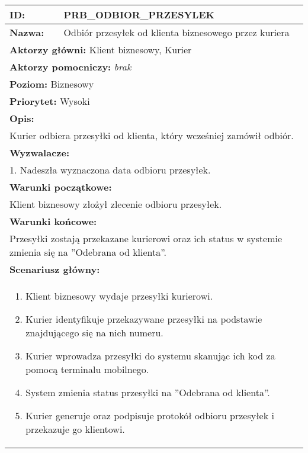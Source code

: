 \begin{center}
\begin{longtable}[h]{|p{1.6cm}|p{13.5cm}|}
\hline
\textbf{ID:} & PRB\_ODBIOR\_PRZESYLEK \\ \hline
\textbf{Nazwa:} & Odbiór przesyłek od klienta biznesowego przez kuriera \\ \hline
\multicolumn{2}{|p{15.1cm}|}{\textbf{Aktorzy główni:}  Klient biznesowy, Kurier} \\
\multicolumn{2}{|p{15.1cm}|}{\textbf{Aktorzy pomocniczy:} \textit{brak}} \\
\multicolumn{2}{|p{15.1cm}|}{\textbf{Poziom:}  Biznesowy} \\
\multicolumn{2}{|p{15.1cm}|}{\textbf{Priorytet:}  Wysoki} \\
\hline
\multicolumn{2}{|p{15.1cm}|}{\textbf{Opis:}} \\
\multicolumn{2}{|p{15.1cm}|}{Kurier odbiera przesyłki od klienta, który wcześniej zamówił odbiór.
} \\ \hline
\multicolumn{2}{|p{15.1cm}|}{\textbf{Wyzwalacze:}} \\
\multicolumn{2}{|p{15.1cm}|}{1. Nadeszła wyznaczona data odbioru przesyłek.
} \\ \hline
\multicolumn{2}{|p{15.1cm}|}{\textbf{Warunki początkowe:}} \\
\multicolumn{2}{|p{15.1cm}|}{Klient biznesowy złożył zlecenie odbioru przesyłek.
} \\ \hline
\multicolumn{2}{|p{15.1cm}|}{\textbf{Warunki końcowe:}} \\
\multicolumn{2}{|p{15.1cm}|}{
Przesyłki zostają przekazane kurierowi oraz ich status w systemie zmienia się na ''Odebrana od klienta''.
} \\ \hline
\multicolumn{2}{|p{15.1cm}|}{\textbf{Scenariusz główny:}} \\
\multicolumn{2}{|p{15.1cm}|}{
\begin{enumerate}
\item Klient biznesowy wydaje przesyłki kurierowi. \label{sce:wyd_pacz}
\item Kurier identyfikuje przekazywane przesyłki na podstawie znajdującego się na nich numeru.
\item Kurier wprowadza przesyłki do systemu skanując ich kod za pomocą terminalu mobilnego.
\item System zmienia status przesyłki na ''Odebrana od klienta''.
\item Kurier generuje oraz podpisuje protokół odbioru przesyłek i przekazuje go klientowi.
\end{enumerate}
}
\end{longtable}
\end{center}
